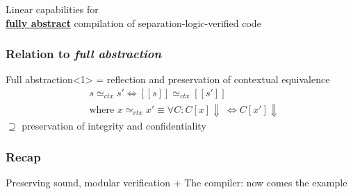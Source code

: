 \documentclass{beamer}
\begin{document}


\begin{frame}[plain,c]
\begin{center}
\Huge Linear capabilities for\\  \textbf{\underline{fully abstract}}
compilation of separation-logic-verified code
\end{center}
\end{frame}

\begin{frame}
\frametitle{Relation to \emph{full abstraction}}
\begin{block}{Full abstraction}<1>
= reflection and preservation of contextual equivalence \\
\vspace{-1em}
\begin{align*}&s\simeq_{ctx}s' \Leftrightarrow [[s]]\simeq_{ctx}[[s']]\\
&\text{where } x\simeq_{ctx}x'\equiv \forall C: C[x]\Downarrow\ \Leftrightarrow C[x']\Downarrow
\end{align*}
$\supseteq$ preservation of integrity and confidentiality \\
\end{block}
\end{frame}


\begin{frame}
\frametitle{Recap}
Preserving sound, modular verification + The compiler: now comes the example
\end{frame}
\end{document}
